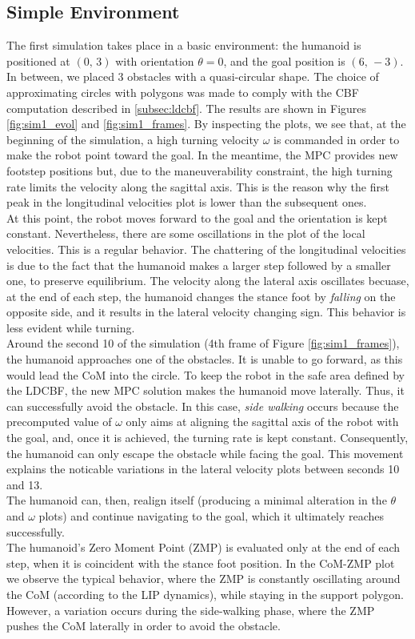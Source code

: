 \subsection{Simple Environment}\label{subsec:sim_simple_env}
The first simulation takes place in a basic environment: the humanoid is positioned at $(0,\,3)$ with orientation $\theta = 0$, and the goal position is $(6,\,-3)$. In between, we placed 3 obstacles with a quasi-circular shape. The choice of approximating circles with polygons was made to comply with the CBF computation described in \ref{subsec:ldcbf}. The results are shown in Figures \ref{fig:sim1_evol} and \ref{fig:sim1_frames}. By inspecting the plots, we see that, at the beginning of the simulation, a high turning velocity $\omega$ is commanded in order to make the robot point toward the goal. In the meantime, the MPC provides new footstep positions but, due to the maneuverability constraint, the high turning rate limits the velocity along the sagittal axis. This is the reason why the first peak in the longitudinal velocities plot is lower than the subsequent ones.\\
At this point, the robot moves forward to the goal and the orientation is kept constant. Nevertheless, there are some oscillations in the plot of the local velocities. This is a regular behavior. The chattering of the longitudinal velocities is due to the fact that the humanoid makes a larger step followed by a smaller one, to preserve equilibrium. The velocity along the lateral axis oscillates becuase, at the end of each step, the humanoid changes the stance foot by \textit{falling} on the opposite side, and it results in the lateral velocity changing sign. This behavior is less evident while turning.\\
Around the second 10 of the simulation (4th frame of Figure \ref{fig:sim1_frames}), the humanoid approaches one of the obstacles. It is unable to go forward, as this would lead the CoM into the circle. To keep the robot in the safe area defined by the LDCBF, the new MPC solution makes the humanoid move laterally. Thus, it can successfully avoid the obstacle. In this case, \textit{side walking} occurs because the precomputed value of $\omega$ only aims at aligning the sagittal axis of the robot with the goal, and, once it is achieved, the turning rate is kept constant. Consequently, the humanoid can only escape the obstacle while facing the goal. This movement explains the noticable variations in the lateral velocity plots between seconds 10 and 13.\\
The humanoid can, then, realign itself (producing a minimal alteration in the $\theta$ and $\omega$ plots) and continue navigating to the goal, which it ultimately reaches successfully.\\
The humanoid's Zero Moment Point (ZMP) is evaluated only at the end of each step, when it is coincident with the stance foot position. In the CoM-ZMP plot we observe the typical behavior, where the ZMP is constantly oscillating around the CoM (according to the LIP dynamics), while staying in the support polygon. However, a variation occurs during the side-walking phase, where the ZMP pushes the CoM laterally in order to avoid the obstacle.

